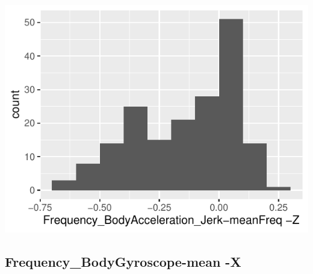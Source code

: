 \documentclass[
]{article}
\begin{document}
\begin{minipage}{0.25 \textwidth}

\includegraphics{codebook_tidydatasub_files/figure-latex/Var-60-Frequency-BodyAcceleration-Jerk-meanFreq--Z-1.pdf}

\end{minipage}

\noindent\makebox[\linewidth]{\rule{\textwidth}{0.4pt}}

\hypertarget{frequency_bodygyroscope-mean--x}{%
\subsection{Frequency\_BodyGyroscope-mean
-X}\label{frequency_bodygyroscope-mean--x}}
\end{document}
